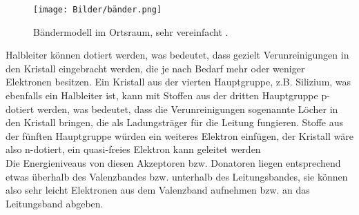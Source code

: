\begin{figure}[H]
    \centering
    \texttt{[image: Bilder/bänder.png]}
    \caption{Bändermodell im Ortsraum, sehr vereinfacht \cite{magnesium}.}
    \label{fig:bänder}
\end{figure}

Halbleiter können dotiert werden, was bedeutet, dass gezielt Verunreinigungen in den Kristall eingebracht werden, die je nach Bedarf mehr oder weniger Elektronen besitzen.
Ein Kristall aus der vierten Hauptgruppe, z.B. Silizium, was ebenfalls ein Halbleiter ist, kann mit Stoffen aus der dritten Hauptgruppe p-dotiert werden, was bedeutet, dass die Verunreinigungen sogenannte Löcher
in den Kristall bringen, die als Ladungsträger für die Leitung fungieren. Stoffe aus der fünften Hauptgruppe würden ein weiteres Elektron einfügen, der Kristall wäre also n-dotiert, ein quasi-freies Elektron kann geleitet werden\\
Die Energieniveaus von diesen Akzeptoren bzw. Donatoren liegen entsprechend etwas überhalb des Valenzbandes bzw. unterhalb des Leitungsbandes, sie können also sehr leicht Elektronen aus dem Valenzband aufnehmen bzw. an das Leitungsband abgeben.


